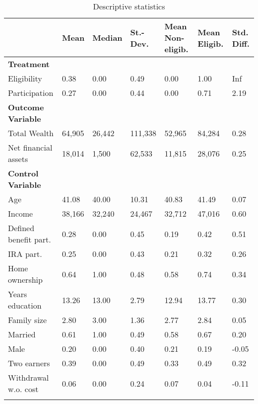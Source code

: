 \begin{tiny}
\begin{ThreePartTable}
				\begin{longtable}{l C{1.45cm} C{1.45cm} C{1.45cm} C{1.45cm}C{1.45cm} C{1.45cm}}
					\caption{Descriptive statistics}\label{tab_descriptives}\\
					\toprule
					 & Mean & Median & St.-Dev. & Mean Non-eligib. & Mean Eligib. & Std. Diff.\\ 
					\midrule
					\textbf{Treatment} & & & & & & \\
					Eligibility & 0.38 & 0.00 & 0.49 & 0.00 & 1.00 & Inf \\ 
  Participation & 0.27 & 0.00 & 0.44 & 0.00 & 0.71 & 2.19 \\ 
  					\midrule
					\textbf{Outcome Variable} & & & & & & \\
					 Total Wealth & 64,905 & 26,442 & 111,338 & 52,965 & 84,284 & 0.28 \\ 
  Net financial assets & 18,014 & 1,500 & 62,533 & 11,815 & 28,076 & 0.25 \\ 
					\midrule
					\textbf{Control Variable}  & & & & & & \\
				  Age & 41.08 & 40.00 & 10.31 & 40.83 & 41.49 & 0.07 \\ 
Income & 38,166 & 32,240 & 24,467 & 32,712 & 47,016 & 0.60 \\ 
  Defined benefit part. & 0.28 & 0.00 & 0.45 & 0.19 & 0.42 & 0.51 \\ 
   IRA part. & 0.25 & 0.00 & 0.43 & 0.21 & 0.32 & 0.26 \\ 
 Home ownership & 0.64 & 1.00 & 0.48 & 0.58 & 0.74 & 0.34 \\ 
  Years education & 13.26 & 13.00 & 2.79 & 12.94 & 13.77 & 0.30 \\ 
  Family size & 2.80 & 3.00 & 1.36 & 2.77 & 2.84 & 0.05 \\ 
  Married & 0.61 & 1.00 & 0.49 & 0.58 & 0.67 & 0.20 \\ 
  Male & 0.20 & 0.00 & 0.40 & 0.21 & 0.19 & -0.05 \\ 
  Two earners & 0.39 & 0.00 & 0.49 & 0.33 & 0.49 & 0.32 \\ 
   Withdrawal w.o. cost & 0.06 & 0.00 & 0.24 & 0.07 & 0.04 & -0.11 \\ 

				\bottomrule
				\insertTableNotes \\
				\end{longtable} 

				
			\end{ThreePartTable}
	\end{tiny}
